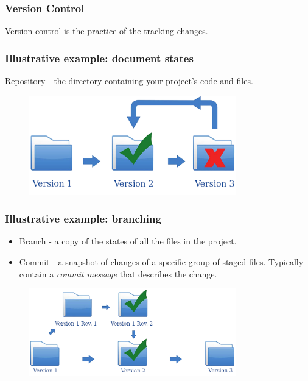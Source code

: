 \begin{frame}
    \frametitle{Version Control}
    \begin{center}
        Version control is the practice of the tracking changes.
    \end{center}
\end{frame}

\begin{frame}
  \frametitle{Illustrative example: document states}
  Repository - the directory containing your project's code and files.
  \begin{figure}[htpb]
      \centering
      \includegraphics[width=0.8\textwidth]{images/singleton-vc.png}
  \end{figure}
\end{frame}

\begin{frame}
    \frametitle{Illustrative example: branching}
    \begin{itemize}
       \item Branch - a copy of the states of all the files in the project.
       \item Commit - a snapshot of changes of a specific group of staged files. Typically contain a {\it commit message} that describes the change.
    \end{itemize}

    \begin{figure}[htpb]
        \centering
        \includegraphics[width=0.8\textwidth]{images/branching-vc.png}
    \end{figure} 
\end{frame}

